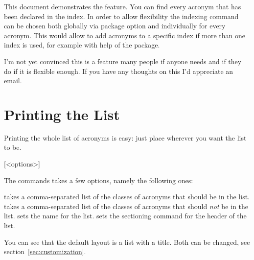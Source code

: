 \documentclass[DIV10,toc=index,toc=bib,hyperfootnotes=false]{cnpkgdoc}
\makeatletter
\providecommand*\changedversion[1]{%
  \@bsphack
  \marginnote{%
    \footnotesize\sffamily\RaggedRight
    \textcolor{black!75}{Changed in version~#1}}%
  \@esphack}
\makeatother
\begin{document}
This document demonstrates the feature. You can find every acronym that has been
declared in the index. In order to allow flexibility the indexing command can be
chosen both globally via package option and individually for every acronym. This
would allow to add acronyms to a specific index if more than one index is used,
for example with help of the  package.

I'm not yet convinced this is a feature many people if anyone needs and if they
do if it is flexible enough. If you have any thoughts on this I'd appreciate an
email.

\section{Printing the List}\label{sec:print_lists}
\noindent\changedversion{1.0}Printing the whole list of acronyms is easy: just
place  wherever you want the list to be.
\begin{beschreibung}
 [<options>]
\end{beschreibung}
The commands takes a few options, namely the following ones:
\begin{beschreibung}
 \newline
   takes a comma-separated list of the classes of acronyms that should be in the
   list.
 \newline
   takes a comma-separated list of the classes of acronyms that should \emph{not}
   be in the list.
 \newline
   sets the name for the list.
   sets the sectioning command for the header of the list.
\end{beschreibung}
\begin{beispiel}
 \printacronyms[exclude-classes=city]

 \printacronyms[include-classes=city,name={City Acronyms}]
\end{beispiel}
\printacronyms[exclude-classes=city]

\printacronyms[include-classes=city,name={City Acronyms}]

You can see that the default layout is a  list with a
 title. Both can be changed, see section~\ref{sec:customization}.
\end{document}
